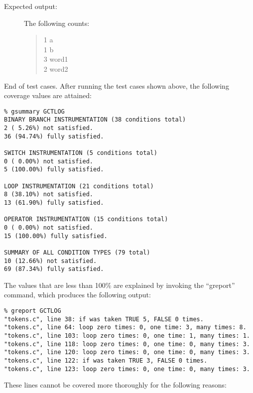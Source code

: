 \begin{enumerate}
\begin{description}
\item[Expected output:] The following counts:

	\begin{quote}
	1 a\\
	1 b\\
	3 word1\\
	2 word2\\
	\end{quote}
\end{description}
\end{enumerate}
End of test cases.
\newpage
\noindent
After running the test cases shown above, the following coverage
values are attained:
{\small
\begin{verbatim}
% gsummary GCTLOG 
BINARY BRANCH INSTRUMENTATION (38 conditions total)
2 ( 5.26%) not satisfied.
36 (94.74%) fully satisfied.

SWITCH INSTRUMENTATION (5 conditions total)
0 ( 0.00%) not satisfied.
5 (100.00%) fully satisfied.

LOOP INSTRUMENTATION (21 conditions total)
8 (38.10%) not satisfied.
13 (61.90%) fully satisfied.

OPERATOR INSTRUMENTATION (15 conditions total)
0 ( 0.00%) not satisfied.
15 (100.00%) fully satisfied.

SUMMARY OF ALL CONDITION TYPES (79 total)
10 (12.66%) not satisfied.
69 (87.34%) fully satisfied.
\end{verbatim}
}

\noindent
The values that are less than 100\% are explained by invoking the
``greport'' command, which produces the following output:
{\small
\begin{verbatim}
% greport GCTLOG 
"tokens.c", line 38: if was taken TRUE 5, FALSE 0 times.
"tokens.c", line 64: loop zero times: 0, one time: 3, many times: 8.
"tokens.c", line 103: loop zero times: 0, one time: 1, many times: 1.
"tokens.c", line 118: loop zero times: 0, one time: 0, many times: 3.
"tokens.c", line 120: loop zero times: 0, one time: 0, many times: 3.
"tokens.c", line 122: if was taken TRUE 3, FALSE 0 times.
"tokens.c", line 123: loop zero times: 0, one time: 0, many times: 3.
\end{verbatim}
}

\noindent
These lines cannot be covered more thoroughly for the following reasons:

